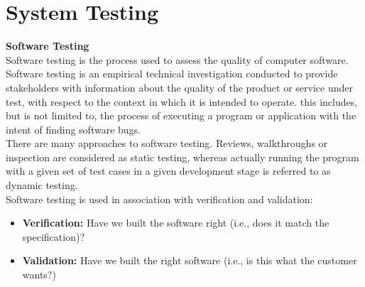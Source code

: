 \chapter{System Testing}
\textbf{Software Testing}
\\\hspace*{0.82cm}Software testing is the process used to assess the quality of computer software. Software testing is an empirical 
technical investigation conducted to provide stakeholders with information about the quality of the product or service under test, 
with respect to the context in which it is intended to operate. this includes, but is not limited to, the process of executing a 
program or application with the intent of finding software bugs.\\[0.5cm]
\hspace*{0.82cm}There are many approaches to software testing. Reviews, walkthroughs or inspection are considered as static testing, 
whereas actually running the program with a given set of test cases in a given development stage is referred to as dynamic 
testing.\\[0.5cm]
Software testing is used in association with verification and validation:
\begin{itemize}
 \item \textbf{Verification: }Have we built the software right (i.e., does it match the specification)?
 \item \textbf{Validation: }Have we built the right software (i.e., is this what the customer wants?)
\end{itemize}

